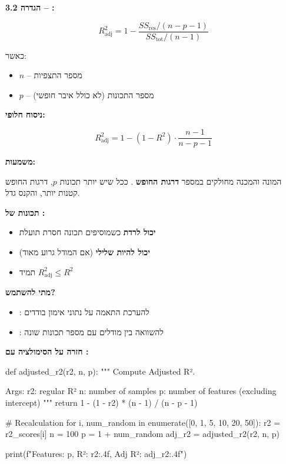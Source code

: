 \textbf{הגדרה \num{3.2} – :}

\begin{equation}
R^2_{\text{adj}} = 1 - \frac{SS_{\text{res}} / (n - p - 1)}{SS_{\text{tot}} / (n - 1)}
\end{equation}

כאשר:
\begin{itemize}
\item $n$ – מספר התצפיות
\item $p$ – מספר התכונות (לא כולל איבר חופשי)
\end{itemize}

\textbf{ניסוח חלופי:}

\begin{equation}
R^2_{\text{adj}} = 1 - (1 - R^2) \cdot \frac{n - 1}{n - p - 1}
\end{equation}

\textbf{משמעות:}

המונה והמכנה מחולקים במספר \textbf{דרגות החופש} . ככל שיש יותר תכונות $p$, דרגות החופש קטנות יותר, והקנס גדל.

\textbf{תכונות של :}

\begin{itemize}
\item \textbf{יכול לרדת} כשמוסיפים תכונה חסרת תועלת
\item \textbf{יכול להיות שלילי} (אם המודל גרוע מאוד)
\item תמיד $R^2_{\text{adj}} \leq R^2$
\end{itemize}

\textbf{מתי להשתמש?}

\begin{itemize}
\item \textbf{\Rsquared{}}: להערכת התאמה על נתוני אימון בודדים
\item \textbf{}: להשוואה בין מודלים עם מספר תכונות שונה
\end{itemize}

\textbf{חזרה על הסימולציה עם :}

\begin{pythonbox*}
def adjusted_r2(r2, n, p):
    """
    Compute Adjusted R².

    Args:
        r2: regular R²
        n: number of samples
        p: number of features (excluding intercept)
    """
    return 1 - (1 - r2) * (n - 1) / (n - p - 1)

# Recalculation
for i, num_random in enumerate([0, 1, 5, 10, 20, 50]):
    r2 = r2_scores[i]
    n = 100
    p = 1 + num_random
    adj_r2 = adjusted_r2(r2, n, p)

    print(f"Features: {p}, R²: {r2:.4f}, Adj R²: {adj_r2:.4f}")
\end{pythonbox*}

